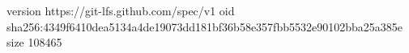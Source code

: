version https://git-lfs.github.com/spec/v1
oid sha256:4349f6410dea5134a4de19073dd181bf36b58e357fbb5532e90102bba25a385e
size 108465
